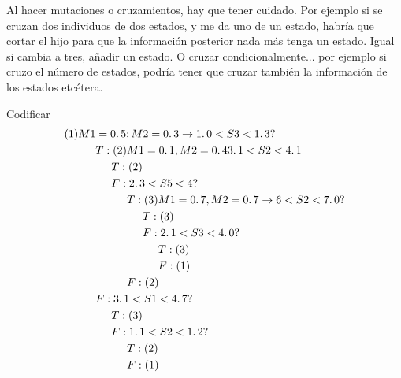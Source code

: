 \begin{nota}
	Al hacer mutaciones o cruzamientos, hay que tener cuidado. Por ejemplo si se cruzan dos individuos
	de dos estados, y me da uno de un estado, habría que cortar el hijo para que la información posterior nada
	más tenga un estado. Igual si cambia a tres, añadir un estado. O cruzar condicionalmente... por ejemplo si
	cruzo el número de estados, podría tener que cruzar también la información de los estados etcétera.
\end{nota}

\begin{ejemplo}
	Codificar 
	\begin{equation}
	\begin{aligned}
		(1) M1 & = 0\ldotp 5; M2 = 0\ldotp3 \rightarrow 1 \ldotp 0 < S3 < 1\ldotp3 ? \\
		& T: (2) M1 = 0\ldotp1, M2 = 0\ldotp4  3\ldotp1 < S2 < 4\ldotp1 \\
		&\hspace{0.5cm} T: (2) \\
		&\hspace{0.5cm} F: 2\ldotp3 < S5 < 4 ? \\
		&\hspace{1cm}T: (3) M1 = 0\ldotp7, M2 = 0\ldotp7 \rightarrow 6 < S2 < 7\ldotp0 ? \\
		& \hspace{1.5cm} T: (3) \\ 
		& \hspace{1.5cm}F: 2\ldotp1 < S3 < 4\ldotp0 ? \\ 
		& \hspace{2cm}T: (3) \\
		& \hspace{2cm}F: (1) \\
		& \hspace{1cm}F: (2) \\ 
		& F: 3\ldotp1 < S1 < 4\ldotp7 ? \\
		& \hspace{0.5cm} T: (3) \\ 
		& \hspace{0.5cm}F: 1\ldotp1 < S2 < 1\ldotp2 ? \\
		& \hspace{1cm}T: (2) \\
		& \hspace{1cm}F: (1) \\ 
	\end{aligned}
	\end{equation}
\end{ejemplo}


